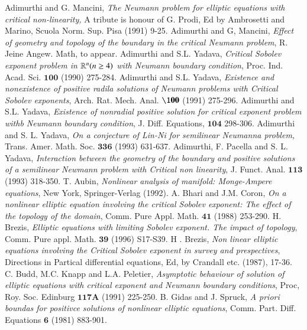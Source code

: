 \begin{thebibliography}{99}
 Adimurthi and G. Mancini, \textit{The Neumann problem for elliptic equations with critical non-linearity,} A tribute is honour of G. Prodi, Ed by Ambrosetti and Marino, Scuola Norm. Sup. Pisa (1991) 9-25.
 Adimurthi and G, Mancini, \textit{Effect of geometry and topology of the boundary in the critical Neumann problem}, R. Jeine Angew. Math, to appear.
 Adimurthi and S.L. Yadava, \textit{Critical Sobolev exponent problem in $\mathbb{R}^{n}(n\geq 4)$ with Neumann boundary condition}, Proc. Ind. Acad. Sci. ${\mathbf {100}}$ (1990) 275-284.
 Adimurthi and S.L. Yadava, \textit{Existence and nonexistence of positive radila solutions of Neumann problems with Critical Sobolev exponents}, Arch. Rat. Mech. Anal. ${\mathbf{\100}}$ (1991) 275-296.
 Adimurthi and S.L. Yadava, \textit{Existence of nonradial positive solution for critical exponent problem withb Neumann boundary condition}, J. Diff. Equations, ${\mathbf{104}}$ 298-306.
 Adimurthi and S. L. Yadava, \textit{On a conjecture of Lin-Ni for semilinear Neumanna problem,} Trans. Amer. Math. Soc. ${\mathbf{336}}$ (1993) 631-637.
 Adimurthi, F. Pacella and S. L. Yadava, \textit{Interaction between the geometry of the boundary and positive solutions of a semilinear Newmann problem with Critical non linearity}, J. Funct. Anal. ${\mathbf{113}}$ (1993) 318-350.
 T. Aubin, \textit{Nonlinear analysis of manifold: Monge-Ampere equations}, New York, Springer-Verlag (1992).
 A. Bhari and J.M. Coron, \textit{On a nonlinear elliptic equation involving the critical Sobolev exponent: The effect of the topology of the domain}, Comm. Pure Appl. Math. ${\mathbf{41}}$ (1988) 253-290.
 H. Brezis, \textit{Elliptic equations with limiting Sobolev exponent. The impact of topology}, Comm. Pure appl. Math. ${\mathbf{39}}$ (1996) S17-S39.
 H . Brezis, \textit{Non linear elliptic equations involving the Critical Sobolev exponent in survey and prespectives}, Directions in Partical differential equations, Ed, by Crandall etc. (1987),  17-36.
 C. Budd, M.C. Knapp and L.A. Peletier, \textit{Asymptotic behaviour of solution of elliptic equations with critical exponent and Neumann boundary conditions}, Proc, Roy. Soc. Edinburg ${\mathbf{117A}}$ (1991) 225-250.
 B. Gidas and J. Spruck, \textit{A priori boundas for positivce solutions of nonlinear elliptic equations}, Comm. Part. Diff. Equations ${\mathbf{6}}$ (1981) 883-901.

\end{thebibliography}
